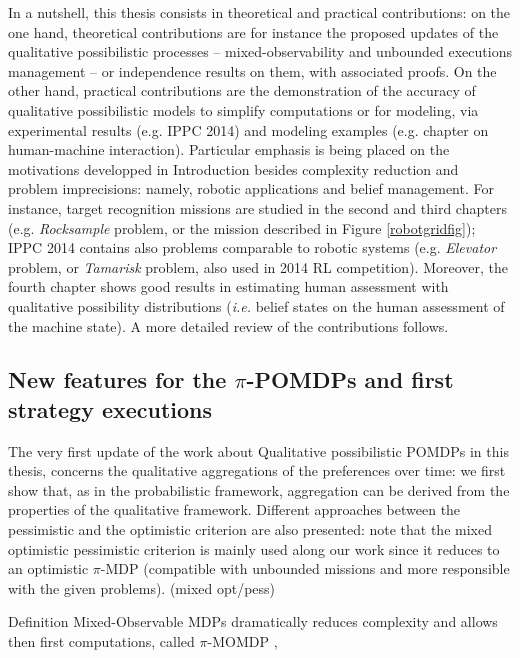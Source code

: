 In a nutshell, 
this thesis consists in
theoretical and practical contributions:
on the one hand, theoretical contributions 
are for instance 
the proposed updates of the qualitative possibilistic processes
-- mixed-observability and unbounded executions management -- 
or independence results on them, with associated proofs.
On the other hand, 
practical contributions
are the demonstration of the accuracy 
of qualitative possibilistic models
to simplify computations or for modeling,
via experimental results (e.g. IPPC 2014) 
and modeling examples (e.g. chapter on human-machine interaction).
Particular emphasis is being placed 
on the motivations developped in Introduction
besides complexity reduction and problem imprecisions:
namely, robotic applications and belief management.
For instance, target recognition missions 
are studied in the second and third chapters 
(e.g. \textit{Rocksample} problem, or the mission described in Figure \ref{robotgridfig});
IPPC 2014 contains also problems comparable to robotic systems 
(e.g. \textit{Elevator} problem, or \textit{Tamarisk} problem, also used in 2014 RL competition). 
Moreover, the fourth chapter shows good results 
in estimating human assessment with qualitative possibility distributions
(\textit{i.e.} belief states on the human assessment of the machine state).
A more detailed review of the contributions follows.


\subsection*{New features for the $\pi$-POMDPs
and first strategy executions}
The very first update of the work \cite{Sabbadin:1999:pipomdp} 
about Qualitative possibilistic POMDPs in this thesis, 
concerns the qualitative aggregations of the preferences over time:
we first show that, as in the probabilistic framework,
aggregation can be derived from the properties of the qualitative framework.
Different approaches between the pessimistic and the optimistic criterion
are also presented: note that the mixed optimistic pessimistic criterion
is mainly used along our work since it reduces to an optimistic $\pi$-MDP
(compatible with unbounded missions and more responsible with the given problems).
(mixed opt/pess)

Definition Mixed-Observable MDPs \cite{OngShaoHsuWee-IJRR10}
dramatically reduces complexity and allows then first computations, 
called $\pi$-MOMDP \cite{Drougard13}, 

